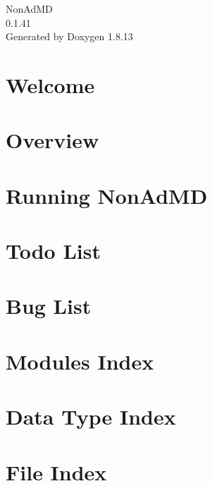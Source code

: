 \documentclass[twoside]{book}
\newcommand{\+}{\discretionary{\mbox{\scriptsize$\hookleftarrow$}}{}{}}
\newcommand{\clearemptydoublepage}{%
  \newpage{\pagestyle{empty}\cleardoublepage}%
}
\begin{document}
\hypersetup{pageanchor=false,
             bookmarksnumbered=true,
             pdfencoding=unicode
            }
\begin{titlepage}
\vspace*{7cm}
\begin{center}%
{\Large Non\+Ad\+MD \\[1ex]\large 0.\+1.\+41 }\\
\vspace*{1cm}
{\large Generated by Doxygen 1.8.13}\\
\end{center}
\end{titlepage}
\clearemptydoublepage
{}
\tableofcontents
\clearemptydoublepage
{}
\hypersetup{pageanchor=true}

\chapter{Welcome}
\label{index}\hypertarget{index}{}
\chapter{Overview}
\label{_overview}

\chapter{Running Non\+Ad\+MD}
\label{_interface}

\chapter{Todo List}
\label{todo}

\chapter{Bug List}
\label{bug}

\chapter{Modules Index}

\chapter{Data Type Index}

\chapter{File Index}

\end{document}
